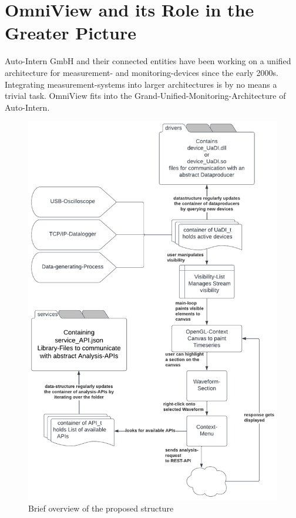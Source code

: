 \documentclass[]{scrreprt}
\begin{document}
\section[Greater Picture]{OmniView and its Role in the Greater Picture}
Auto-Intern GmbH and their connected entities have been working on a unified architecture for measurement- and monitoring-devices since the early 2000s.
Integrating measurement-systems into larger architectures is by no means a trivial task.
OmniView fits into the Grand-Unified-Monitoring-Architecture of Auto-Intern.




\begin{figure}
    \includegraphics[width=.9\textwidth]{./assets/pictures/overview.pdf}
    \caption[]{Brief overview of the proposed structure}
    \label{fig:overview}
\end{figure}
\end{document}
